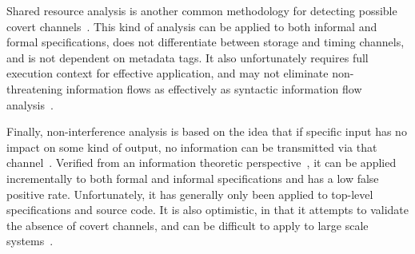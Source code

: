 \documentclass{sbir}
\begin{document}
Shared resource analysis is another common methodology for detecting possible covert channels~\cite{Kemmerer83,Haigh87}. This kind of analysis can be applied to both informal and formal specifications, does not differentiate between storage and timing channels, and is not dependent on metadata tags. It also unfortunately requires full execution context for effective application, and may not eliminate non-threatening information flows as effectively as syntactic information flow analysis~\cite{Gligor93}.

Finally, non-interference analysis is based on the idea that if specific input has no impact on some kind of output, no information can be transmitted via that channel~\cite{Goguen84,Feiertag80}. Verified from an information theoretic perspective~\cite{Gligor93}, it can be applied incrementally to both formal and informal specifications and has a low false positive rate. Unfortunately, it has generally only been applied to top-level specifications and source code. It is also optimistic, in that it attempts to validate the absence of covert channels, and can be difficult to apply to large scale systems~\cite{Gligor93}.
\end{document}
